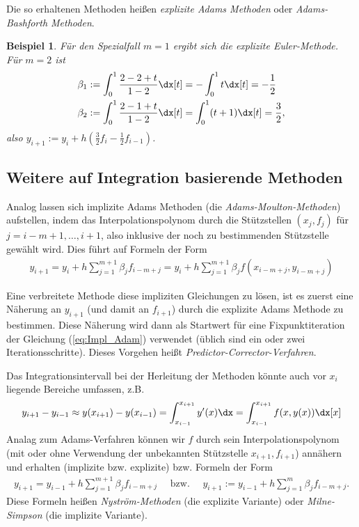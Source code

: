 \documentclass[
]{mycourse}
\theoremstyle{mythm}
\newtheorem{beispiel}[theorem]{Beispiel}
\theoremstyle{break}
\newcommand{\labeq}[1]{\label{eq:#1}}			%
\newcommand{\req}[1]{(\ref{eq:#1})}
\begin{document}
Die so erhaltenen Methoden heißen \emph{explizite Adams Methoden} oder \emph{Adams-Bashforth Methoden}. 
\begin{beispiel}
Für den Spezialfall $m=1$ ergibt sich die explizite Euler-Methode.
Für $m=2$ ist
\begin{align*}
\beta_1&:= \int_0^1 \frac{2-2+t}{1-2}\dx[t]=-\int_0^1 t\dx[t]=-\frac{1}{2}\\
\beta_2&:= \int_0^1 \frac{2-1+t}{1-2}\dx[t]=\int_0^1 (t+1)\dx[t]=\frac{3}{2},
\end{align*}
also $y_{i+1}:=y_i + h (\frac{3}{2}f_i-\frac{1}{2}f_{i-1})$.
\end{beispiel}

\subsection{Weitere auf Integration basierende Methoden}\label{subsect:multistep_int}

Analog lassen sich implizite Adams Methoden (die \emph{Adams-Moulton-Methoden}) aufstellen,
indem das Interpolationspolynom durch die Stützstellen $(x_j,f_j)$ für $j=i-m+1,\ldots,i+1$,
also inklusive der noch zu bestimmenden Stützstelle gewählt wird. Dies führt auf Formeln 
der Form 
\begin{align}\labeq{Impl_Adam}
y_{i+1}=y_i+h\sum_{j=1}^{m+1}\beta_j f_{i-m + j}
=y_i+h\sum_{j=1}^{m+1}\beta_j f(x_{i-m+j},y_{i-m+j})
\end{align}

Eine verbreitete Methode diese impliziten Gleichungen zu lösen, ist es zuerst eine Näherung an
$y_{i+1}$ (und damit an $f_{i+1}$) durch die explizite Adams Methode zu bestimmen. Diese Näherung
wird dann als Startwert für eine Fixpunktiteration der Gleichung \req{Impl_Adam} verwendet
(üblich sind ein oder zwei Iterationsschritte).
Dieses Vorgehen heißt \emph{Predictor-Corrector-Verfahren}.

Das Integrationsintervall bei der Herleitung der Methoden könnte auch vor $x_i$ liegende
Bereiche umfassen, z.B.
\[
y_{i+1}-y_{i-1}\approx y(x_{i+1})-y(x_{i-1})=\int_{x_{i-1}}^{x_{i+1}} y'(x) \dx
=\int_{x_{i-1}}^{x_{i+1}} f(x,y(x)) \dx[x]
\]
Analag zum Adams-Verfahren können wir $f$ durch sein Interpolationspolynom (mit oder ohne
Verwendung der unbekannten Stützstelle $x_{i+1},f_{i+1}$) annähern und erhalten 
(implizite bzw. explizite) bzw. Formeln der Form
\begin{align*}
y_{i+1}=y_{i-1}+h\sum_{j=1}^{m+1}\beta_j f_{i-m + j} \quad \mbox{ bzw. } \quad
y_{i+1}:=y_{i-1}+h\sum_{j=1}^{m}\beta_j f_{i-m + j}.
\end{align*}
Diese Formeln heißen \emph{Nyström-Methoden} (die explizite Variante) oder \emph{Milne-Simpson}
(die implizite Variante).
\end{document}
